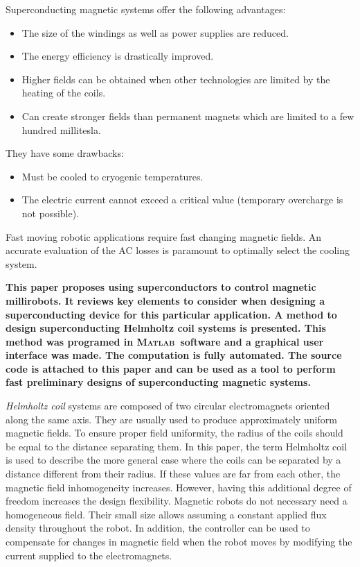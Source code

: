 \documentclass{ws-jmrr}
\newcommand{\MATLAB}{{\textsc{Matlab}}}
\begin{document}
\begin{multicols}{2}
Superconducting magnetic systems offer the following advantages:
\begin{itemize}[leftmargin=*]
\item The size of the windings as well as power supplies are reduced.
\item The energy efficiency is drastically improved.
\item Higher fields can be obtained when other technologies are limited by the heating of the coils.
\item Can create stronger fields than permanent magnets which are limited to a few hundred millitesla.
\end{itemize}
They have some drawbacks:
\begin{itemize}[leftmargin=*]
\item Must be cooled to cryogenic temperatures.
\item The electric current cannot exceed a critical value (temporary overcharge is not possible).
\end{itemize}
Fast moving robotic applications require fast changing magnetic fields. An accurate evaluation of the AC losses is paramount to optimally select the cooling system.\par
\textbf{
This paper proposes using superconductors to control magnetic millirobots. It reviews key elements to consider when designing a superconducting device for this particular application. A method to design superconducting Helmholtz coil systems is presented. This method was programed in \MATLAB ~software and a graphical user interface was made. The computation is fully automated. The source code is attached to this paper and can be used as a tool to perform fast preliminary designs of superconducting magnetic systems.}\par

\emph{Helmholtz coil} systems are composed of two circular electromagnets oriented along the same axis. They are usually used to produce approximately uniform magnetic fields. To ensure proper field uniformity, the radius of the coils should be equal to the distance separating them. In this paper, the term Helmholtz coil is used to describe the more general case where the coils can be separated by a distance different from their radius. If these values are far from each other, the magnetic field inhomogeneity increases. However, having this additional degree of freedom increases the design flexibility. Magnetic robots do not necessary need a homogeneous field. Their small size allows assuming a constant applied flux density throughout the robot. In addition, the controller can be used to compensate for changes in magnetic field when the robot moves by modifying the current supplied to the electromagnets.


\end{multicols}
\end{document}
